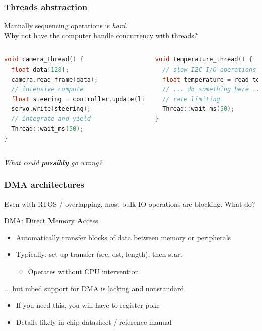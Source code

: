 \documentclass{beamer}
\begin{document}
\begin{frame}[fragile]
\frametitle{Threads abstraction}
Manually sequencing operations is \textit{hard}. \\
Why not have the computer handle concurrency with threads? \\
\begin{columns}[t]
\begin{lstlisting}[language=C++,basicstyle=\ttfamily\scriptsize]
void camera_thread() {
  float data[128];
  camera.read_frame(data);
  // intensive compute
  float steering = controller.update(line_detect(data));
  servo.write(steering);
  // integrate and yield
  Thread::wait_ms(50);
}
\end{lstlisting}
\begin{lstlisting}[language=C++,basicstyle=\ttfamily\scriptsize]
void temperature_thread() {
  // slow I2C I/O operations
  float temperature = read_temperature();
  // ... do something here ...
  // rate limiting
  Thread::wait_ms(50);
}
\end{lstlisting}
\end{columns}
\textit{What could \textbf{possibly} go wrong?}
\end{frame}


\begin{frame}
\frametitle{DMA architectures}
Even with RTOS / overlapping, most bulk IO operations are blocking. What do? \\
\hfill \break
{} {
DMA: \textbf{D}irect \textbf{M}emory \textbf{A}ccess
\begin{itemize}
  \item Automatically transfer blocks of data between memory or peripherals
  \item Typically: set up transfer (src, dst, length), then start
  \begin{itemize}
    \item Operates without CPU intervention
  \end{itemize}
\end{itemize}
\hfill \break
... but mbed support for DMA is lacking and nonstandard.
\begin{itemize}
  \item If you need this, you will have to register poke
  \item Details likely in chip datasheet / reference manual
\end{itemize}
}
\end{frame}
\end{document}
